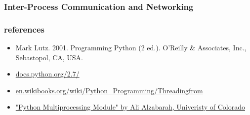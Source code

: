 \documentclass{beamer}
\begin{document}
\begin{frame}[fragile]
\frametitle{Inter-Process Communication and Networking}

\end{frame}

\begin{frame}
 \frametitle{references}
 \begin{itemize}
  \item Mark Lutz. 2001. Programming Python (2 ed.). O'Reilly \& Associates, Inc., Sebastopol, CA, USA.
  \item \href{https://docs.python.org/2.7/}{docs.python.org/2.7/}
  \item \href{http://en.wikibooks.org/wiki/Python_Programming/Threadingfrom}{en.wikibooks.org/wiki/Python\_Programming/Threadingfrom}
  \item \href{http://www.cs.colorado.edu/~kena/classes/5828/s10/presentations/ali_alzabarah_se_presentati.pdf}{"Python Multiprocessing
Module" by Ali Alzabarah, Univeristy of Colorado}
 \end{itemize}
\end{frame}
	







%
\end{document}

